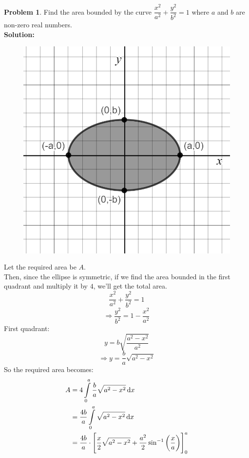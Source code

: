 \documentclass[14]{article}
\theoremstyle{definition}
\newtheorem{prob}{Problem}
\theoremstyle{case}
\begin{document}
\begin{enumerate}
\begin{figure}[h]
\end{figure}
\end{enumerate}
\pagebreak
\begin{prob}
Find the area bounded by the curve $\dfrac{x^2}{a^2} + \dfrac{y^2}{b^2} = 1$ where $a$ and $b$ are non-zero real numbers.\\
\textbf{Solution:}\\
\begin{figure}[h]\centering
\includegraphics[scale=.2]{images/ellipse}
\end{figure}
Let the required area be $A$.\\
Then, since the ellipse is symmetric, if we find the area bounded in the first quadrant and multiply it by $4$, we'll get the total area.
\[\dfrac{x^2}{a^2} + \dfrac{y^2}{b^2} = 1\]
\[\Rightarrow \dfrac{y^2}{b^2} = 1 - \dfrac{x^2}{a^2}\]
First quadrant:
\[y = b\sqrt{\dfrac{a^2 - x^2}{a^2}}\]
\[\Rightarrow y = \dfrac{b}{a} \sqrt{a^2 - x^2}\]
So the required area becomes:
\begin{align*}
A &= 4 \int\limits_0^a \dfrac{b}{a} \sqrt{a^2 - x^2} \dif x\\
&= \dfrac{4b}{a} \int\limits_0^a \sqrt{a^2 - x^2} \dif x\\
&= \dfrac{4b}{a} \cdot \left[ \dfrac{x}2 \sqrt{a^2 - x^2} + \dfrac{a^2}{2} \sin^{-1}\left( \dfrac{x}{a} \right) \right]_0^a\\

\end{align*}
\end{prob}
\end{document}
